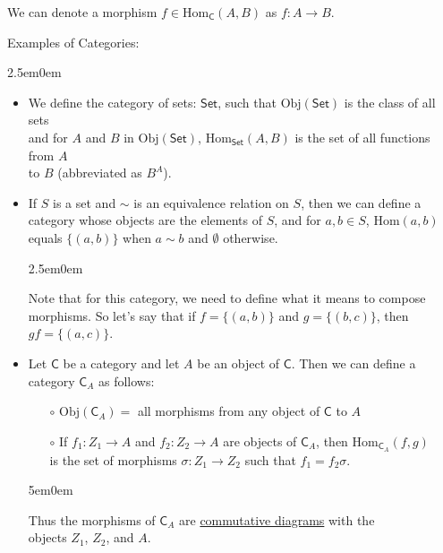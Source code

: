 \documentclass{book}
\newcommand{\exOne}{%
   \color{Purple}%
   \fontsize{14}{16}\selectfont%
}
\newcommand{\exTwo}{%
   \color{RedViolet}%
   \fontsize{13}{15}\selectfont%
}
\newcommand{\exP}{%
   \color{VioletRed}%
   \fontsize{12}{14}\selectfont%
}
\newenvironment{myIndent}{%
   \begin{adjustwidth}{2.5em}{0em}%
}{%
   \end{adjustwidth}%
}
\newenvironment{myDindent}{%
   \begin{adjustwidth}{5em}{0em}%
}{%
   \end{adjustwidth}%
}
\newcommand{\myObj}{\mathrm{Obj}}
\newcommand{\myHom}{\mathrm{Hom}}
\newcommand{\mcateg}[1]{\mathsf{#1}}
\newcommand{\retTwo}{\hfill\bigbreak}
\begin{document}
   We can denote a morphism $f \in \myHom_\mcateg{C}(A, B)$ as $f: A \rightarrow B$.\retTwo

   \exOne
   Examples of Categories:
   \begin{myIndent} \exTwo
      \begin{itemize}
         \item We define the category of sets: $\mcateg{Set}$, such that $\myObj(\mcateg{Set})$ is the class of all sets\\ and for $A$ and $B$ in $\myObj(\mcateg{Set})$, $\myHom_\mcateg{Set}(A, B)$ is the set of all functions from $A$\\ to $B$ (abbreviated as $B^A$).\newpage
         
         \item If $S$ is a set and $\sim$ is an equivalence relation on $S$, then we can define a\\ category whose objects are the elements of $S$, and for $a, b \in S$, $\myHom(a, b)$\\ equals $\{(a, b)\}$ when $a \sim b$ and $\emptyset$ otherwise.
         {\begin{myIndent} \exP
            Note that for this category, we need to define what it means to compose\\ morphisms. So let's say that if $f = \{(a, b)\}$ and $g = \{(b, c)\}$, then\\ $gf = \{(a, c)\}$.\retTwo
         \end{myIndent}}

         \item Let $\mcateg{C}$ be a category and let $A$ be an object of $\mcateg{C}$. Then we can define a category $\mcateg{C}_A$ as follows:
         \begin{itemize}
            \item[$\circ$] $\myObj(\mcateg{C}_A) =$ all morphisms from any object of $\mcateg{C}$ to $A$
            \item[$\circ$] If $f_1: Z_1 \longrightarrow A$ and $f_2: Z_2 \longrightarrow A$ are objects of $\mcateg{C}_A$, then $\myHom_{\mcateg{C}_A}(f, g)$\\ is the set of morphisms $\sigma: Z_1 \rightarrow Z_2$ such that $f_1 = f_2\sigma$.
         \end{itemize}
         {\begin{myDindent} \exP
            Thus the morphisms of $\mcateg{C}_A$ are \ul{commutative diagrams} with the\\ objects $Z_1$, $Z_2$, and $A$.\\ [-12pt]


\end{myDindent}}
\end{itemize}
\end{myIndent}
\end{document}
